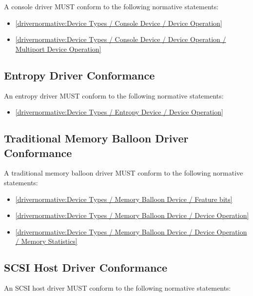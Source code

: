 A console driver MUST conform to the following normative statements:

\begin{itemize}
\item \ref{drivernormative:Device Types / Console Device / Device Operation}
\item \ref{drivernormative:Device Types / Console Device / Device Operation / Multiport Device Operation}
\end{itemize}

\subsection{Entropy Driver Conformance}\label{sec:Conformance / Driver Conformance / Entropy Driver Conformance}

An entropy driver MUST conform to the following normative statements:

\begin{itemize}
\item \ref{drivernormative:Device Types / Entropy Device / Device Operation}
\end{itemize}

\subsection{Traditional Memory Balloon Driver Conformance}\label{sec:Conformance / Driver Conformance / Traditional Memory Balloon Driver Conformance}

A traditional memory balloon driver MUST conform to the following normative statements:

\begin{itemize}
\item \ref{drivernormative:Device Types / Memory Balloon Device / Feature bits}
\item \ref{drivernormative:Device Types / Memory Balloon Device / Device Operation}
\item \ref{drivernormative:Device Types / Memory Balloon Device / Device Operation / Memory Statistics}
\end{itemize}

\subsection{SCSI Host Driver Conformance}\label{sec:Conformance / Driver Conformance / SCSI Host Driver Conformance}

An SCSI host driver MUST conform to the following normative statements:

